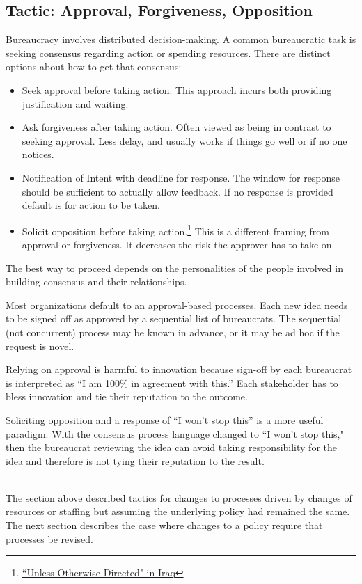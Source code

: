 \subsection*{Tactic: Approval, Forgiveness, Opposition\label{sec:approval-forgiveness-opposition}}

Bureaucracy involves distributed decision-making. 
A common bureaucratic task is seeking consensus regarding action or spending resources. There are distinct options about how to get that consensus:
\begin{itemize}
    \item Seek approval before taking action. This approach incurs both providing justification and waiting.
    \item Ask forgiveness after taking action. Often viewed as being in contrast to seeking approval. Less delay, and usually works if things go well or if no one notices. 
    \item Notification of Intent with deadline for response. The window for response should be sufficient to actually allow feedback. If no response is provided default is for action to be taken.
    \item Solicit opposition before taking action.\footnote{\href{https://www.dailykos.com/stories/2009/2/11/696188/-}{``Unless Otherwise Directed" in Iraq}} This is a different framing from approval or forgiveness. It decreases the risk the approver has to take on.
\end{itemize}
The best way to proceed depends on the personalities of the people involved in building consensus and their relationships. 

Most organizations default to an approval-based  processes. Each new idea needs to be signed off as approved by a sequential list of \glspl{bureaucrat}. The sequential (not concurrent) process may be known in advance, or it may be ad hoc if the request is novel.

Relying on approval is harmful to innovation because sign-off by each bureaucrat is interpreted as ``I am 100\% in agreement with this.'' Each stakeholder has to bless innovation and tie their reputation to the outcome.

Soliciting opposition and a response of ``I won't stop this'' is a more useful paradigm. With the consensus process language changed to ``I won't stop this," then the bureaucrat reviewing the idea can avoid taking responsibility for the idea and therefore is not tying their reputation to the result.


\noindent\hrulefill

\ \\

The section above described tactics for changes to processes driven by changes of resources or staffing but assuming the underlying policy had remained the same. The next section describes the case where changes to a policy require that processes be revised. 